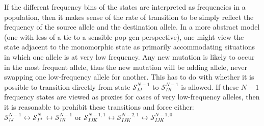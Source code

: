 \documentclass{llncs}
\newcommand{\pomoState}[3]{\ensuremath{\mathcal{S}_{#1#2}^{#3}}}
\newcommand{\triPomoState}[5]{\ensuremath{\mathcal{S}_{#1#2#3}^{#4,#5}}}
\begin{document}
If the different frequency bins of the states are interpreted as frequencies in a population, then
    it makes sense of the rate of transition to be simply reflect the frequency of the source allele 
    and the destination allele.
In a more abstract model (one with less of a tie to a sensible pop-gen perspective), one might view
    the state adjacent to the monomorphic state as primarily accommodating situations in which one
    allele is at very low frequency.
Any new mutation is likely to occur in the most frequent allele, thus the new mutation will be
    adding allele, never swapping one low-frequency allele for another.
This has to do with whether it is possible to transition directly from state $\pomoState{I}{J}{N-1}$ to
    $\pomoState{I}{K}{N-1}$ is allowed.
If these $N-1$ frequency states are viewed as proxies for cases of very low-frequency alleles, then 
    it is reasonable to prohibit these transitions and force either:
    $\pomoState{I}{J}{N-1} \leftrightarrow \pomoState{I}{\ast}{N} \leftrightarrow \pomoState{I}{K}{N-1}$
    or $\triPomoState{I}{J}{K}{N-1}{1} \leftrightarrow \triPomoState{I}{J}{K}{N-2}{1} \leftrightarrow \triPomoState{I}{J}{K}{N-1}{0}$
\end{document}

